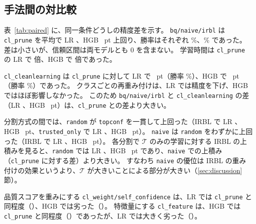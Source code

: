 \documentclass[a4paper,10pt]{ltjsarticle}
\newcommand{\method}[1]{\texttt{#1}}
\begin{document}
\subsection{手法間の対比較}
表~\ref{tab:paired} に、同一条件どうしの精度差を示す。
\method{bq/naive/irbl} は \method{cl\_prune} を平均で LR \PLRNaiveIrblVsPrune{}、HGB \PHGBNaiveIrblVsPrune{}~pt 上回り、勝率はそれぞれ \PLRNaiveIrblVsPruneWin\%、\PHGBNaiveIrblVsPruneWin\% であった。
差は小さいが、信頼区間は両モデルとも 0 を含まない。
学習時間は \method{cl\_prune} の LR で \TimeLRRatio{} 倍、HGB で \TimeHGBRatio{} 倍であった。

\method{cl\_cleanlearning} は \method{cl\_prune} に対して LR で \PLRCLVsPrune{}~pt（勝率 \PLRCLVsPruneWin\%）、HGB で \PHGBCLVsPrune{}~pt（勝率 \PHGBCLVsPruneWin\%）であった。
クラスごとの再重み付けは、LR では精度を下げ、HGB ではほぼ影響しなかった。
このため \method{bq/naive/irbl} と \method{cl\_cleanlearning} の差（LR \PLRNaiveIrblVsCL{}、HGB \PHGBNaiveIrblVsCL{}~pt）は、\method{cl\_prune} との差より大きい。

分割方式の間では、\method{random} が \method{topconf} を一貫して上回った（IRBL で LR \PLRRandomIrblVsTopIrbl{}、HGB \PHGBRandomIrblVsTopIrbl{}~pt、\method{trusted\_only} で LR \PLRRandomTVsTopT{}、HGB \PHGBRandomTVsTopT{}~pt）。
\method{naive} は \method{random} をわずかに上回った（IRBL で LR \PLRNaiveIrblVsRandomIrbl{}、HGB \PHGBNaiveIrblVsRandomIrbl{}~pt）。
各分割で $\mathcal{T}$ のみの学習に対する IRBL の上積みを見ると、\method{random} では LR \PLRRandomIrblVsRandomT{}、HGB \PHGBRandomIrblVsRandomT{}~pt であり、\method{naive} での上積み（\method{cl\_prune} に対する差）より大きい。
すなわち \method{naive} の優位は IRBL の重み付けの効果というより、$\mathcal{T}$ が大きいことによる部分が大きい（\ref{sec:discussion} 節）。

品質スコアを重みにする \method{cl\_weight/self\_confidence} は、LR では \method{cl\_prune} と同程度（\PLRWeightVsPrune）、HGB では劣った（\PHGBWeightVsPrune）。
特徴量にする \method{cl\_feature} は、HGB では \method{cl\_prune} と同程度（\PHGBFeatureVsPrune）であったが、LR では大きく劣った（\PLRFeatureVsPrune）。

\begin{table}[tbp]
  \centering
  \caption{同一条件における手法 A と手法 B の精度差（pt）。勝率は A が B を上回った条件の割合（\%）。差は丸める前の精度から計算しているため、表~\ref{tab:overall} の丸めた値どうしの差と 0.01~pt ずれることがある。}
  \label{tab:paired}
  \footnotesize
  \setlength{\tabcolsep}{4pt}
  
\end{table}
\end{document}
